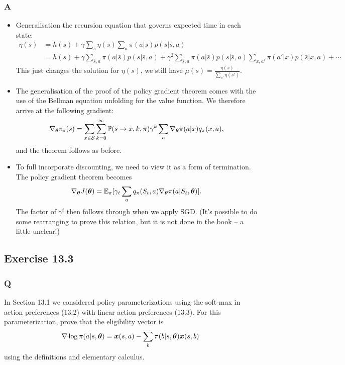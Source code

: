 \subsubsection*{A}
\begin{itemize}
    \item Generalisation the recursion equation that governs expected time in each state:
    \begin{align*}
        \eta(s) &= h(s) + \gamma \sum_{\bar{s}}\eta(\bar{s}) \sum_a \pi(a \vert{} \bar{s}) p(s \vert{} \bar{s}, a)\\
                &= h(s) + \gamma \sum_{\bar{s}, a}\pi(a \vert{} \bar{s}) p(s \vert{} \bar{s}, a) + \gamma ^2 \sum_{\bar{s}, a}\pi(a \vert{} \bar{s}) p(s \vert{} \bar{s}, a) \sum_{x, a'}\pi(a' \vert{} x) p(\bar{s} \vert{} x, a) + \cdots
    \end{align*}
    This just changes the solution for $\eta(s)$, we still have $\mu(s) = \frac{\eta(s)}{\sum_{s'} \eta(s')}$.
    \item The generalisation of the proof of the policy gradient theorem comes with the use of the Bellman  equation unfolding for the value function. We therefore arrive at the following gradient:
    \[
        \nabla_{\boldsymbol{\theta}} v_\pi(s) = \sum_{x \in \mathcal{S}{}}\sum_{k = 0}^\infty \mathbb{P}{}(s \to x, k, \pi)\gamma^k\sum_a \nabla_{\boldsymbol{\theta}} \pi(a \vert{} x) q_\pi(x, a),
    \]
    and the theorem follows as before.
    \item To full incorporate discounting, we need to view it as a form of termination. The policy gradient theorem becomes
    \[
        \nabla_{\boldsymbol{\theta}} J(\boldsymbol{\theta}) = \mathbb{E}_\pi[\gamma_t \sum_a q_\pi(S_t, a) \nabla_{\boldsymbol{\theta}} \pi(a \vert{} S_t, \boldsymbol{\theta})].
    \]
    The factor of $\gamma^t$ then follows through when we apply SGD. (It's possible to do some rearranging to prove this relation, but it is not done in the book --  a little unclear!)
\end{itemize}

\subsection{Exercise 13.3}
\subsubsection*{Q}
In Section 13.1 we considered policy parameterizations using the soft-max in action preferences (13.2) with linear action preferences (13.3). For this parameterization, prove that the eligibility vector is
\[
    \nabla \log \pi(a \vert{} s, \boldsymbol{\theta}) = \boldsymbol{x}(s, a) - \sum_b \pi(b \vert{} s, \boldsymbol{\theta})\boldsymbol{x}(s, b)
\]
using the definitions and elementary calculus.

